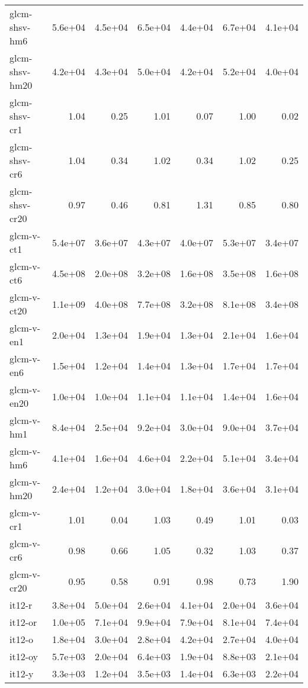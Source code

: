 \begin{tabular}{lrrrrrr}
glcm-shsv-hm6       & 5.6e+04 & 4.5e+04 & 6.5e+04 & 4.4e+04 & 6.7e+04 & 4.1e+04 \\
glcm-shsv-hm20      & 4.2e+04 & 4.3e+04 & 5.0e+04 & 4.2e+04 & 5.2e+04 & 4.0e+04 \\
glcm-shsv-cr1       &    1.04 &    0.25 &    1.01 &    0.07 &    1.00 &    0.02 \\
glcm-shsv-cr6       &    1.04 &    0.34 &    1.02 &    0.34 &    1.02 &    0.25 \\
glcm-shsv-cr20      &    0.97 &    0.46 &    0.81 &    1.31 &    0.85 &    0.80 \\
glcm-v-ct1          & 5.4e+07 & 3.6e+07 & 4.3e+07 & 4.0e+07 & 5.3e+07 & 3.4e+07 \\
glcm-v-ct6          & 4.5e+08 & 2.0e+08 & 3.2e+08 & 1.6e+08 & 3.5e+08 & 1.6e+08 \\
glcm-v-ct20         & 1.1e+09 & 4.0e+08 & 7.7e+08 & 3.2e+08 & 8.1e+08 & 3.4e+08 \\
glcm-v-en1          & 2.0e+04 & 1.3e+04 & 1.9e+04 & 1.3e+04 & 2.1e+04 & 1.6e+04 \\
glcm-v-en6          & 1.5e+04 & 1.2e+04 & 1.4e+04 & 1.3e+04 & 1.7e+04 & 1.7e+04 \\
glcm-v-en20         & 1.0e+04 & 1.0e+04 & 1.1e+04 & 1.1e+04 & 1.4e+04 & 1.6e+04 \\
glcm-v-hm1          & 8.4e+04 & 2.5e+04 & 9.2e+04 & 3.0e+04 & 9.0e+04 & 3.7e+04 \\
glcm-v-hm6          & 4.1e+04 & 1.6e+04 & 4.6e+04 & 2.2e+04 & 5.1e+04 & 3.4e+04 \\
glcm-v-hm20         & 2.4e+04 & 1.2e+04 & 3.0e+04 & 1.8e+04 & 3.6e+04 & 3.1e+04 \\
glcm-v-cr1          &    1.01 &    0.04 &    1.03 &    0.49 &    1.01 &    0.03 \\
glcm-v-cr6          &    0.98 &    0.66 &    1.05 &    0.32 &    1.03 &    0.37 \\
glcm-v-cr20         &    0.95 &    0.58 &    0.91 &    0.98 &    0.73 &    1.90 \\
it12-r              & 3.8e+04 & 5.0e+04 & 2.6e+04 & 4.1e+04 & 2.0e+04 & 3.6e+04 \\
it12-or             & 1.0e+05 & 7.1e+04 & 9.9e+04 & 7.9e+04 & 8.1e+04 & 7.4e+04 \\
it12-o              & 1.8e+04 & 3.0e+04 & 2.8e+04 & 4.2e+04 & 2.7e+04 & 4.0e+04 \\
it12-oy             & 5.7e+03 & 2.0e+04 & 6.4e+03 & 1.9e+04 & 8.8e+03 & 2.1e+04 \\
it12-y              & 3.3e+03 & 1.2e+04 & 3.5e+03 & 1.4e+04 & 6.3e+03 & 2.2e+04 \\

\end{tabular}
